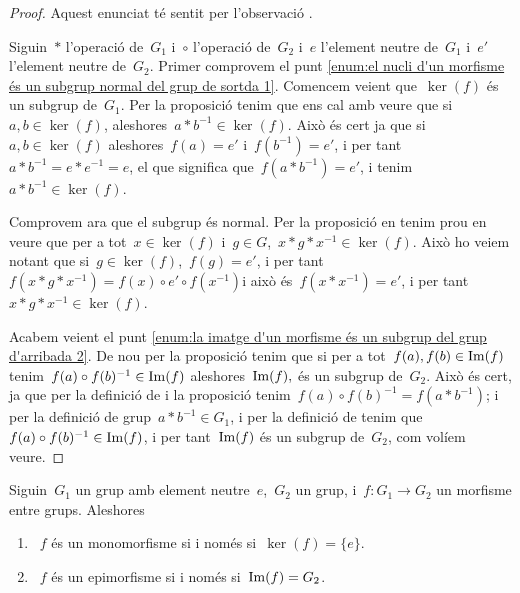 \documentclass[../../main.tex]{subfiles}
\begin{document}
    \begin{proof}
        Aquest enunciat té sentit per l'observació .

        Siguin~\(\ast\) l'operació de~\(G_{1}\) i~\(\circ\) l'operació de~\(G_{2}\) i~\(e\) l'element neutre de~\(G_{1}\) i~\(e'\) l'element neutre de~\(G_{2}\).
        Primer comprovem el punt \eqref{enum:el nucli d'un morfisme és un subgrup normal del grup de sortda 1}.
        Comencem veient que~\(\ker(f)\) és un subgrup de~\(G_{1}\).
        Per la proposició  tenim que ens cal amb veure que si~\(a,b\in\ker(f)\), aleshores~\(a\ast b^{-1}\in\ker(f)\).
        Això és cert ja que si~\(a,b\in\ker(f)\) aleshores~\(f(a)=e'\) i~\(f(b^{-1})=e'\), i per tant~\(a\ast b^{-1}=e\ast e^{-1}=e\), el que significa que~\(f(a\ast b^{-1})=e'\), i tenim~\(a\ast b^{-1}\in\ker(f)\).

        Comprovem ara que el subgrup és normal.
        Per la proposició  en tenim prou en veure que per a tot~\(x\in\ker(f)\) i~\(g\in G\),~\(x\ast g\ast x^{-1}\in\ker(f)\).
        Això ho veiem notant que si~\(g\in\ker(f)\),~\(f(g)=e'\), i per tant~\(f(x\ast g\ast x^{-1})=f(x)\circ e'\circ f(x^{-1})\)i això és~\(f(x\ast x^{-1})=e'\), i per tant~\(x\ast g\ast x^{-1}\in\ker(f)\).

        Acabem veient el punt \eqref{enum:la imatge d'un morfisme és un subgrup del grup d'arribada 2}.
        De nou per la proposició  tenim que si per a tot~\(f(a),f(b)\in\operatorname{Im}(f)\) tenim~\(f(a)\circ f(b)^{-1}\in\operatorname{Im}(f)\) aleshores~\(\operatorname{Im}(f),\) és un subgrup de~\(G_{2}\).
        Això és cert, ja que per la definició de  i la proposició  tenim~\(f(a)\circ f(b)^{-1}=f(a\ast b^{-1})\); i per la definició de grup~\(a\ast b^{-1}\in G_{1}\), i per la definició de  tenim que~\(f(a)\circ f(b)^{-1}\in\operatorname{Im}(f)\), i per tant~\(\operatorname{Im}(f)\) és un subgrup de~\(G_{2}\), com volíem veure.
    \end{proof}
    \begin{proposition}
        \label{prop:condicions equivalents a monomorfisme i epimorfisme per nucli i imatge}
        Siguin~\(G_{1}\) un grup amb element neutre~\(e\),~\(G_{2}\) un grup, i~\(f\colon G_{1}\to G_{2}\) un morfisme entre grups.
        Aleshores
        \begin{enumerate}
            \item\label{enum:condicions equivalents a monomorfisme i epimorfisme per nucli i imatge 1}~\(f\) és un monomorfisme si i només si~\(\ker(f)=\{e\}\).
            \item\label{enum:condicions equivalents a monomorfisme i epimorfisme per nucli i imatge 2}~\(f\) és un epimorfisme si i només si~\(\operatorname{Im}(f)=G_{2}\).
        \end{enumerate}
    \end{proposition}
\end{document}
